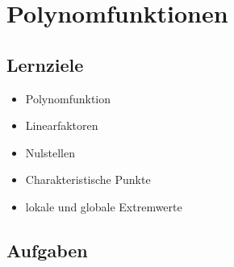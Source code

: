 
\section{Polynomfunktionen}

\subsection*{Lernziele}

\begin{itemize}
\item Polynomfunktion
\item Linearfaktoren
\item Nulstellen
\item Charakteristische Punkte
\item lokale und globale Extremwerte
\end{itemize}

\subsection*{Aufgaben}


\newpage

